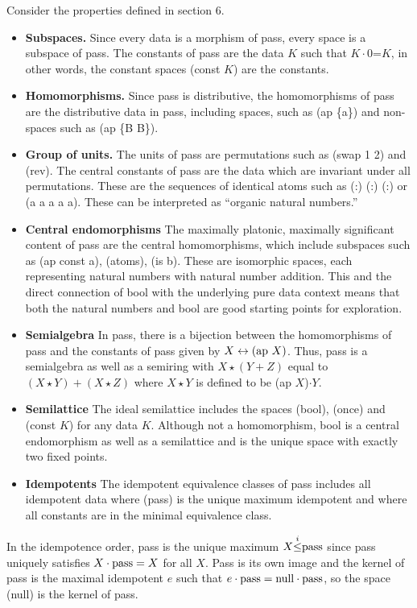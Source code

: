 \documentclass[11pt]{article}
\begin{document}
Consider the properties defined in section 6.  
\begin{itemize}
\item{{\bf Subspaces.}  Since every data is a morphism of pass, every space is a subspace of pass.  The constants of pass are the data $K$ such that 
$K\cdot 0$=$K$, in other words, the constant spaces (const $K$) are the constants.}
\item{{\bf Homomorphisms.} Since pass is distributive, the homomorphisms of pass are the distributive data in pass, including spaces, such as (ap \{a\}) 
and non-spaces such as (ap \{B B\}).} 
\item{{\bf Group of units.} The units of pass are permutations such as (swap 1 2) and (rev).  The central constants of pass are the data which 
are invariant under all permutations.  These are the sequences of identical atoms such as (:) (:) (:) or (a a a a a).  These can be interpreted as ``organic natural numbers.''}
\item{{\bf Central endomorphisms} The maximally platonic, maximally significant content of pass are the central homomorphisms, which include 
subspaces such as (ap const a), (atoms), (is b).  These are isomorphic spaces, each representing natural numbers with natural number 
addition.  This and the direct connection of bool with the underlying pure data context means that 
both the natural numbers and bool are good starting points for exploration.} 
\item{{\bf Semialgebra} In pass, there is a bijection between the homomorphisms of pass and the constants of pass given by $X\leftrightarrow ({\rm ap}\ X)$.  Thus,
pass is a semialgebra as well as a semiring with $X\star (Y+Z)$ equal to $(X\star Y)+(X\star Z)$ where $X\star Y$ is defined to be (ap $X$)$\cdot Y$.}
\item{{\bf Semilattice} The ideal semilattice includes the spaces (bool), (once) and (const $K$) for any data $K$. Although not a homomorphism,
bool is a central endomorphism as well as a semilattice and is the unique space with exactly two fixed points.} 
\item{{\bf Idempotents} The idempotent equivalence classes of pass includes all idempotent data where (pass) is the unique maximum idempotent and where all constants 
are in the minimal equivalence class.}
\end{itemize}
In the idempotence order, pass is the unique maximum $X{\overset i\leq}{\rm pass}$ since pass uniquely satisfies 
$X\cdot {\rm pass}=X$ for all $X$.  Pass is its own image and the kernel of pass is the maximal idempotent $e$ such that $e\cdot {\rm pass}={\rm null}\cdot{\rm pass}$, 
so the space (null) is the kernel of pass.  
\end{document}
